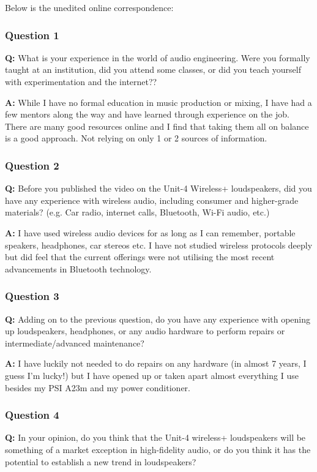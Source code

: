\documentclass[conference]{IEEEtran}
\begin{document}
Below is the unedited online correspondence:

\subsubsection*{Question 1}
\textbf{Q:} What is your experience in the world of audio engineering. Were you formally
taught at an institution, did you attend some classes, or did you teach yourself with
experimentation and the internet??

\textbf{A:} While I have no formal education in music production or mixing, I have had a few
mentors along the way and have learned through experience on the job. There are many good
resources online and I find that taking them all on balance is a good approach. Not relying
on only 1 or 2 sources of information.

\subsubsection*{Question 2}
\textbf{Q:} Before you published the video on the Unit-4 Wireless+ loudspeakers, did you have
any experience with wireless audio, including consumer and higher-grade materials? (e.g. Car
radio, internet calls, Bluetooth, Wi-Fi audio, etc.)


\textbf{A:}  I have used wireless audio devices for as long as I can remember, portable
speakers, headphones, car stereos etc. I have not studied wireless protocols deeply but did
feel that the current offerings were not utilising the most recent advancements in Bluetooth
technology.

\subsubsection*{Question 3}
\textbf{Q:} Adding on to the previous question, do you have any experience with opening up
loudspeakers, headphones, or any audio hardware to perform repairs or intermediate/advanced
maintenance?

\textbf{A:} I have luckily not needed to do repairs on any hardware (in almost 7 years, I
guess I'm lucky!) but I have opened up or taken apart almost everything I use besides my PSI
A23m and my power conditioner.

\subsubsection*{Question 4}
\textbf{Q:} In your opinion, do you think that the Unit-4 wireless+ loudspeakers will be
something of a market exception in high-fidelity audio, or do you think it has the potential
to establish a new trend in loudspeakers?
\end{document}
